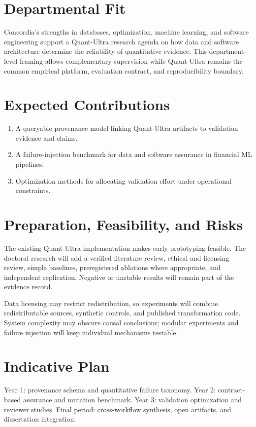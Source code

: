 \documentclass[11pt]{article}
\begin{document}
\newpage
\section*{Departmental Fit}
Concordia's strengths in databases, optimization, machine learning, and software engineering support a Quant-Ultra research agenda on how data and software architecture determine the reliability of quantitative evidence. This department-level framing allows complementary supervision while Quant-Ultra remains the common empirical platform, evaluation contract, and reproducibility boundary.

\section*{Expected Contributions}
\begin{enumerate}
\item A queryable provenance model linking Quant-Ultra artifacts to validation evidence and claims.
\item A failure-injection benchmark for data and software assurance in financial ML pipelines.
\item Optimization methods for allocating validation effort under operational constraints.
\end{enumerate}

\section*{Preparation, Feasibility, and Risks}
The existing Quant-Ultra implementation makes early prototyping feasible. The doctoral research will add a verified literature review, ethical and licensing review, simple baselines, preregistered ablations where appropriate, and independent replication. Negative or unstable results will remain part of the evidence record.

Data licensing may restrict redistribution, so experiments will combine redistributable sources, synthetic controls, and published transformation code. System complexity may obscure causal conclusions; modular experiments and failure injection will keep individual mechanisms testable.

\section*{Indicative Plan}
Year 1: provenance schema and quantitative failure taxonomy. Year 2: contract-based assurance and mutation benchmark. Year 3: validation optimization and reviewer studies. Final period: cross-workflow synthesis, open artifacts, and dissertation integration.
\end{document}
